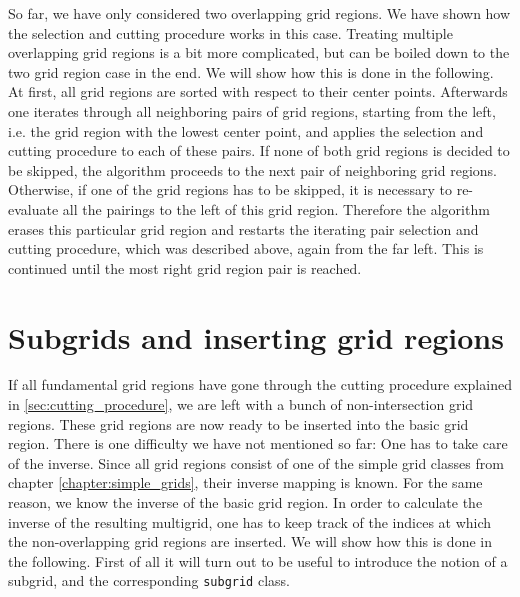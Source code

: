 So far, we have only considered two overlapping grid regions. We have shown how the selection and cutting procedure works in this case. Treating multiple overlapping grid regions is a bit more complicated, but can be boiled down to the two grid region case in the end. We will show how this is done in the following. At first, all grid regions are sorted with respect to their center points. Afterwards one iterates through all neighboring pairs of grid regions, starting from the left, i.e. the grid region with the lowest center point, and applies the selection and cutting procedure to each of these pairs. If none of both grid regions is decided to be skipped, the algorithm proceeds to the next pair of neighboring grid regions. Otherwise, if one of the grid regions has to be skipped, it is necessary to re-evaluate all the pairings to the left of this grid region. Therefore the algorithm erases this particular grid region and restarts the iterating pair selection and cutting procedure, which was described above, again from the far left. This is continued until the most right grid region pair is reached.



\section{Subgrids and inserting grid regions}\label{sec:subgrids_and_insert}
If all fundamental grid regions have gone through the cutting procedure explained in \ref{sec:cutting_procedure}, we are left with a bunch of non-intersection grid regions. These grid regions are now ready to be inserted into the basic grid region. There is one difficulty we have not mentioned so far: One has to take care of the inverse. Since all grid regions consist of one of the simple grid classes from chapter \ref{chapter:simple_grids}, their inverse mapping is known. For the same reason, we know the inverse of the basic grid region. In order to calculate the inverse of the resulting multigrid, one has to keep track of the indices at which the non-overlapping grid regions are inserted. We will show how this is done in the following. First of all it will turn out to be useful to introduce the notion of a subgrid, and the corresponding \texttt{subgrid} class. 


